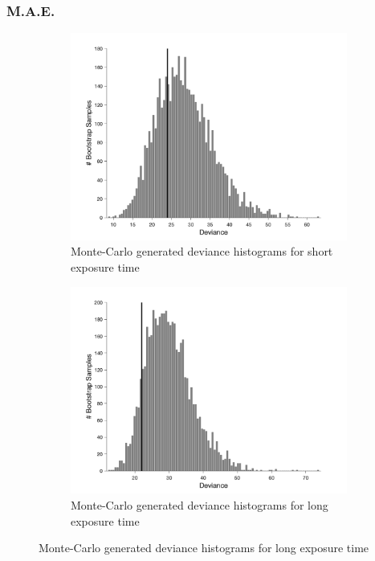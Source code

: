 \documentclass{article}
\begin{document}
\subsubsection*{M.A.E.}
\begin{figure}[!hb]
    \begin{subfigure}{0.494\textwidth}
        \centering
        \includegraphics[width = \linewidth]{Thesis/plots/gof/segSize/segSize_mae_short_bootstrap.png}
        \caption{Monte-Carlo generated deviance histograms for short exposure time}
        \label{fig:da_gof_short_bootstrap}
    \end{subfigure}
    \hspace{0.01\textwidth}
    \begin{subfigure}{0.494\textwidth}
        \centering
        \includegraphics[width = \linewidth]{Thesis/plots/gof/segSize/segSize_mae_long_bootstrap.png}
        \caption{Monte-Carlo generated deviance histograms for long exposure time}
        \label{fig:da_gof_long_bootstrap}
    \end{subfigure}
    

\end{figure}
\end{document}
